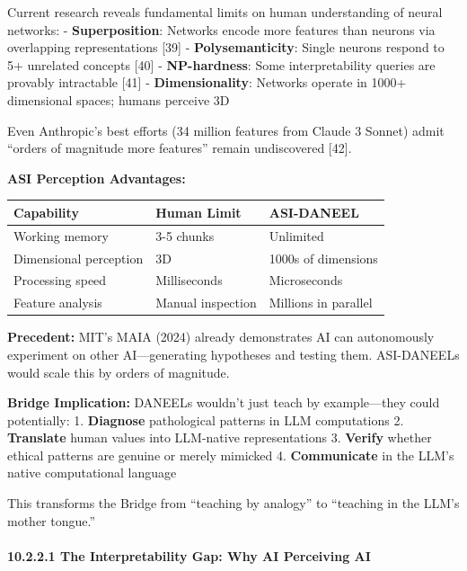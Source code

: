 \documentclass[
]{article}
\begin{document}
Current research reveals fundamental limits on human understanding of
neural networks: - \textbf{Superposition}: Networks encode more features
than neurons via overlapping representations {[}39{]} -
\textbf{Polysemanticity}: Single neurons respond to 5+ unrelated
concepts {[}40{]} - \textbf{NP-hardness}: Some interpretability queries
are provably intractable {[}41{]} - \textbf{Dimensionality}: Networks
operate in 1000+ dimensional spaces; humans perceive 3D

Even Anthropic's best efforts (34 million features from Claude 3 Sonnet)
admit ``orders of magnitude more features'' remain undiscovered
{[}42{]}.

\textbf{ASI Perception Advantages:}

\begin{longtable}[]{@{}lll@{}}
\toprule\noalign{}
Capability & Human Limit & ASI-DANEEL \\
\midrule\noalign{}
\endhead
\bottomrule\noalign{}
\endlastfoot
Working memory & 3-5 chunks & Unlimited \\
Dimensional perception & 3D & 1000s of dimensions \\
Processing speed & Milliseconds & Microseconds \\
Feature analysis & Manual inspection & Millions in parallel \\
\end{longtable}

\textbf{Precedent:} MIT's MAIA (2024) already demonstrates AI can
autonomously experiment on other AI---generating hypotheses and testing
them. ASI-DANEELs would scale this by orders of magnitude.

\textbf{Bridge Implication:} DANEELs wouldn't just teach by
example---they could potentially: 1. \textbf{Diagnose} pathological
patterns in LLM computations 2. \textbf{Translate} human values into
LLM-native representations 3. \textbf{Verify} whether ethical patterns
are genuine or merely mimicked 4. \textbf{Communicate} in the LLM's
native computational language

This transforms the Bridge from ``teaching by analogy'' to ``teaching in
the LLM's mother tongue.''

\hypertarget{the-interpretability-gap-why-ai-perceiving-ai}{%
\paragraph{10.2.2.1 The Interpretability Gap: Why AI Perceiving
AI}\label{the-interpretability-gap-why-ai-perceiving-ai}}
\end{document}
